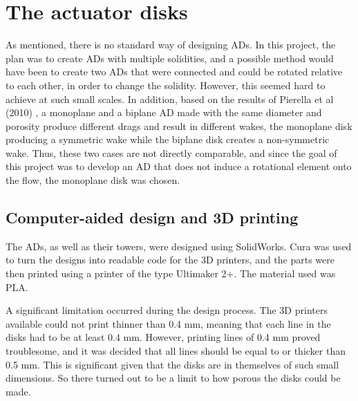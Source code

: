 \section{The actuator disks}
As mentioned, there is no standard way of designing \gls{AD}s. In this project, the plan was to create \gls{AD}s with multiple solidities, and a possible method would have been to create two \gls{AD}s that were connected and could be rotated relative to each other, in order to change the solidity. However, this seemed hard to achieve at such small scales. In addition, based on the results of Pierella et al (2010) \cite{Pierella2010}, a monoplane and a biplane \gls{AD} made with the same diameter and porosity produce different drags and result in different wakes, the monoplane disk producing a symmetric wake while the biplane disk creates a non-symmetric wake. Thus, these two cases are not directly comparable, and since the goal of this project was to develop an \gls{AD} that does not induce a rotational element onto the flow, the monoplane disk was chosen. 

 

\subsection{Computer-aided design and 3D printing}
The \gls{AD}s, as well as their towers, were designed using SolidWorks. Cura was used to turn the designs into readable code for the 3D printers, and the parts were then printed using a printer of the type Ultimaker 2+. The material used was PLA.

A significant limitation occurred during the design process. The 3D printers available could not print thinner than 0.4 \si{\mm}, meaning that each line in the disks had to be at least 0.4 \si{\mm}. However, printing lines of 0.4 \si{\mm} proved troublesome, and it was decided that all lines should be equal to or thicker than 0.5 \si{\mm}. This is significant given that the disks are in themselves of such small dimensions. So there turned out to be a limit to how porous the disks could be made. 


